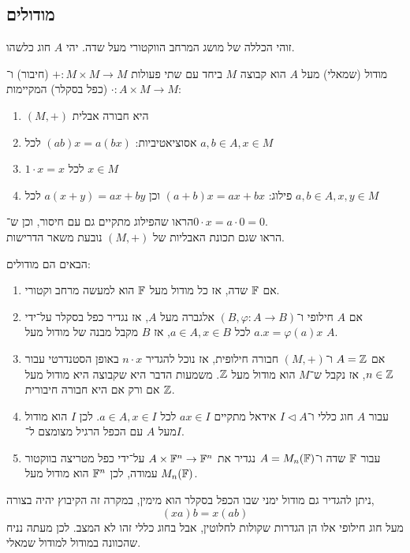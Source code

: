 \subsection{מודולים}
זוהי הכללה של מושג המרחב הווקטורי מעל שדה.
יהי $A$ חוג כלשהו.
\begin{definition}
	מודול (שמאלי) מעל $A$ הוא קבוצה $M$ ביחד עם שתי פעולות $+ : M \times M \to M$ (חיבור) ו־$\cdot : A \times M \to M$ (כפל בסקלר) המקיימות:
	\begin{enumerate}
		\item $(M, +)$ היא חבורה אבלית
		\item אסוציאטיביות: $(a b) x = a (b x)$ לכל $a, b \in A, x \in M$
		\item $1 \cdot x = x$ לכל $x \in M$
		\item פילוג: $(a + b) x = a x + b x$ וכן $a (x + y) = a x + b y$ לכל $a, b \in A, x, y \in M$
	\end{enumerate}
\end{definition}
\begin{exercise}
	הראו שהפילוג מתקיים גם עם חיסור, וכן ש־$0 \cdot x = a \cdot 0 = 0$. \\
	הראו שגם תכונת האבליות של $(M, +)$ נובעת משאר הדרישות.
\end{exercise}
\begin{example}
	הבאים הם מודולים:
	\begin{enumerate}
		\item אם $\mathbb{F}$ שדה, אז כל מודול מעל $\mathbb{F}$ הוא למעשה מרחב וקטורי.
		\item אם $A$ חילופי ו־$(B, \varphi : A \to B)$ אלגברה מעל $A$, אז נגדיר כפל בסקלר על־ידי $a . x = \varphi(a) x$ לכל $a \in A, x \in B$, אז $B$ מקבל מבנה של מודול מעל $A$.
		\item אם $A = \mathbb{Z}$ ו־$(M, +)$ חבורה חילופית, אז נוכל להגדיר $n \cdot x$ באופן הסטנדרטי עבור $n \in \mathbb{Z}$, אז נקבל ש־$M$ הוא מודול מעל $\mathbb{Z}$.
			משמעות הדבר היא שקבוצה היא מודול מעל $\mathbb{Z}$ אם ורק אם היא חבורה חיבורית.
		\item עבור $A$ חוג כללי ו־$I \triangleleft A$ אידאל מתקיים $a x \in I$ לכל $a \in A, x \in I$.
			לכן $I$ הוא מודול מעל $A$ עם הכפל הרגיל מצומצם ל־$I$.
		\item עבור $\mathbb{F}$ שדה ו־$A = M_n(\mathbb{F})$ נגדיר את $A \times \mathbb{F}^n \to \mathbb{F}^n$ על־ידי כפל מטריצה בווקטור עמודה, לכן $\mathbb{F}^n$ הוא מודול מעל $M_n(\mathbb{F})$.
	\end{enumerate}
\end{example}
\begin{remark}
	ניתן להגדיר גם מודול ימני שבו הכפל בסקלר הוא מימין, במקרה זה הקיבוץ יהיה בצורה,
	\[
		(x a) b
		= x (a b)
	\]
	מעל חוג חילופי אלו הן הגדרות שקולות לחלוטין, אבל בחוג כללי זהו לא המצב.
	לכן מעתה נניח שהכוונה במודול למודול שמאלי.
\end{remark}

